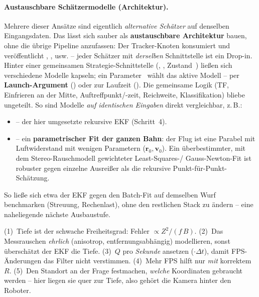 \paragraph{Austauschbare Schätzermodelle (Architektur).} Mehrere dieser Ansätze
sind eigentlich \emph{alternative Schätzer} auf denselben Eingangsdaten. Das lässt
sich sauber als \textbf{austauschbare Architektur} bauen, ohne die übrige Pipeline
anzufassen: Der Tracker-Knoten konsumiert  und veröffentlicht
, ,  usw. -- jeder
Schätzer mit \emph{derselben} Schnittstelle ist ein Drop-in. Hinter einer
gemeinsamen Strategie-Schnittstelle (, ,
Zustand~) ließen sich verschiedene Modelle kapseln; ein
Parameter~ wählt das aktive Modell -- per \textbf{Launch-Argument}
() oder zur Laufzeit (). Die gemeinsame Logik (TF, Einfrieren an der Mitte, Auftreffpunkt/-zeit,
Reichweite, Klassifikation) bliebe ungeteilt. So sind Modelle \emph{auf identischen
Eingaben} direkt vergleichbar, z.\,B.:
\begin{itemize}
\item {} -- der hier umgesetzte rekursive EKF (Schritt~4).
\item {} -- ein \textbf{parametrischer Fit der ganzen Bahn}: der Flug ist
  eine Parabel mit Luftwiderstand mit wenigen Parametern ($\mathbf r_0,\mathbf v_0$).
  Ein überbestimmter, mit dem Stereo-Rauschmodell gewichteter Least-Squares-/
  Gauss-Newton-Fit ist robuster gegen einzelne Ausreißer als die rekursive
  Punkt-für-Punkt-Schätzung.
\end{itemize}
\noindent So ließe sich etwa der EKF gegen den Batch-Fit auf demselben Wurf
benchmarken (Streuung, Rechenlast), ohne den restlichen Stack zu ändern -- eine
naheliegende nächste Ausbaustufe.

\begin{infobox}[title={Lehren -- Stereo-Tracking}]
(1)~Tiefe ist der schwache Freiheitsgrad: Fehler $\propto Z^2/(f\,B)$. (2)~Das
Messrauschen \emph{ehrlich} (anisotrop, entfernungsabhängig) modellieren, sonst
überschätzt der EKF die Tiefe. (3)~$Q$ pro \emph{Sekunde} ansetzen ($\cdot\Delta t$),
damit FPS-Änderungen das Filter nicht verstimmen. (4)~Mehr FPS hilft nur \emph{mit}
korrektem $R$. (5)~Den Standort an der Frage festmachen, \emph{welche} Koordinaten
gebraucht werden -- hier liegen sie quer zur Tiefe, also gehört die Kamera hinter
den Roboter.
\end{infobox}

